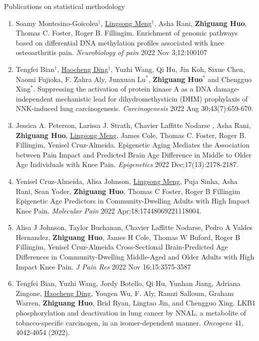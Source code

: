 \documentclass{resume} %
\begin{document}
\begin{rSection}{Publications on statistical methodology}
\begin{enumerate}[noitemsep,topsep=0pt, resume]
\item Soamy Montesino-Goicolea$^\dagger$, \underline{Lingsong Meng}$^\dagger$, Asha Rani, {\bf Zhiguang Huo}, Thomas C. Foster, Roger B. Fillingim.
Enrichment of genomic pathways based on differential DNA methylation profiles associated with knee osteoarthritis pain.
\emph{Neurobiology of pain} 2022 Nov 3;12:100107
\label{bioinfo_31} 



\item
Tengfei Bian$^\dagger$, \underline{Haocheng Ding}$^\dagger$, Yuzhi Wang, Qi Hu, Jin Koh, Sixue Chen, Naomi Fujioka, F. Zahra Aly, Junxuan Lu$^*$, {\bf Zhiguang Huo}$^*$ and Chengguo Xing$^*$.
Suppressing the activation of protein kinase A as a DNA damage-independent mechanistic lead for dihydromethysticin (DHM) prophylaxis of NNK-induced lung carcinogenesis.
\emph{Carcinogenesis} 2022 Aug 30;43(7):659-670.
\label{bioinfo_30} 


\item
Jessica A. Peterson, Larissa J. Strath, Chavier Laffitte Nodarse , Asha Rani, {\bf Zhiguang Huo}, \underline{Lingsong Meng}, James Cole, Thomas C. Foster, Roger B. Fillingim, Yenisel Cruz-Almeida. 
Epigenetic Aging Mediates the Association between Pain Impact and Predicted Brain Age Difference in Middle to Older Age Individuals with Knee Pain.  
\emph{Epigenetics} 2022 Dec;17(13):2178-2187.

\item 
Yenisel Cruz-Almeida, Alisa Johnson, \underline{Lingsong Meng}, Puja Sinha, Asha Rani, Sean Yoder, {\bf Zhiguang Huo}, Thomas C Foster, Roger B Fillingim
Epigenetic Age Predictors in Community-Dwelling Adults with High Impact Knee Pain.
\emph{Molecular Pain} 2022 Apr;18:17448069221118004.

\item  
Alisa J Johnson, Taylor Buchanan, Chavier Laffitte Nodarse, Pedro A Valdes Hernandez, {\bf Zhiguang Huo}, James H Cole, Thomas W Buford, Roger B Fillingim, Yenisel Cruz-Almeida
Cross-Sectional Brain-Predicted Age Differences in Community-Dwelling Middle-Aged and Older Adults with High Impact Knee Pain. 
\emph{J Pain Res} 2022 Nov 16;15:3575-3587


\item
Tengfei Bian, Yuzhi Wang, Jordy Botello, Qi Hu, Yunhan Jiang, Adriana Zingone, \underline{Haocheng Ding}, Yougen Wu, F. Aly, Ramzi Salloum, Graham Warren, {\bf Zhiguang Huo}, Brid Ryan, Lingtao Jin, and Chengguo Xing. 
LKB1 phosphorylation and deactivation in lung cancer by NNAL, a metabolite of tobacco-specific carcinogen, in an isomer-dependent manner.
\emph{Oncogene} 41, 4042-4054 (2022).


\end{enumerate}
\end{rSection}
\end{document}
